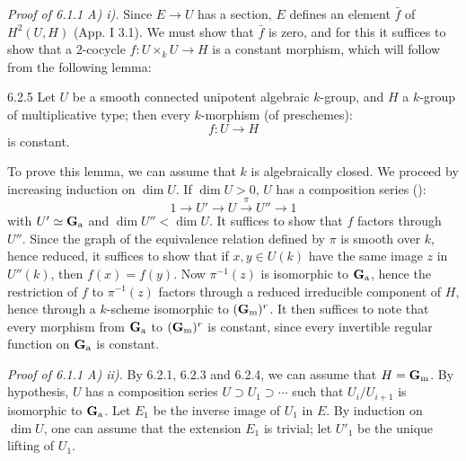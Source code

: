 \noindent\emph{Proof of 6.1.1 A) i).} Since $E\to U$ has a section, $E$ defines an element $\bar f$ of $H^2(U,H)$ (App. I 3.1). We must show that $\bar f$ is zero, and for this it suffices to show that a $2$-cocycle $f:U\times_k U\to H$ is a constant morphism, which will follow from the following lemma:
\begin{lemma}{6.2.5}\label{XVII.6.2.5}
Let $U$ be a smooth connected unipotent algebraic $k$-group, and $H$ a $k$-group of multiplicative type; then every $k$-morphism (of preschemes):
\[
 f:U\to H
\]
is constant.
\end{lemma}
To prove this lemma, we can assume that $k$ is algebraically closed. We proceed by increasing induction on $\dim U$. If $\dim U>0$, $U$ has a composition series ():
\[
 1\to U'\to U\xrightarrow{\pi}U''\to1
\]
with $U'\simeq\mathbf{G}_{\mathrm{a}}$ and $\dim U''<\dim U$. It suffices to show that $f$ factors through $U''$. Since the graph of the equivalence relation defined by $\pi$ is smooth over $k$, hence reduced, it suffices to show that if $x,y\in U(k)$ have the same image $z$ in $U''(k)$, then $f(x)=f(y)$. Now $\pi^{-1}(z)$ is isomorphic to $\mathbf{G}_{\mathrm{a}}$, hence the restriction of $f$ to $\pi^{-1}(z)$ factors through a reduced irreducible component of $H$, hence through a $k$-scheme isomorphic to $(\mathbf{G}_{\mathrm{m}})^r$. It then suffices to note that every morphism from $\mathbf{G}_{\mathrm{a}}$ to $(\mathbf{G}_{\mathrm{m}})^r$ is constant, since every invertible regular function on $\mathbf{G}_{\mathrm{a}}$ is constant.

\noindent\emph{Proof of 6.1.1 A) ii).} By 6.2.1, 6.2.3 and 6.2.4, we can assume that $H=\mathbf{G}_{\mathrm{m}}$. By hypothesis, $U$ has a composition series $U\supset U_1\supset\cdots$ such that $U_i/U_{i+1}$ is isomorphic to $\mathbf{G}_{\mathrm{a}}$. Let $E_1$ be the inverse image of $U_1$ in $E$. By induction on $\dim U$, one can assume that the extension $E_1$ is trivial; let $U'_1$ be the unique lifting of $U_1$.
